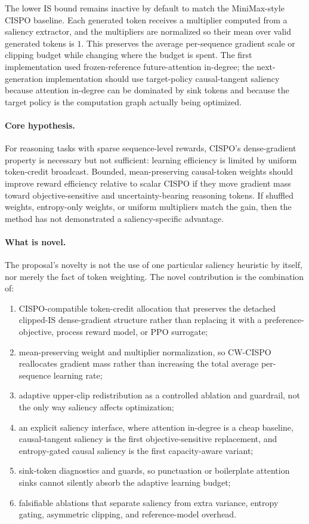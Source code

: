 \documentclass[11pt]{article}
\begin{document}
The lower IS bound remains inactive by default to match the MiniMax-style CISPO
baseline. Each generated token receives a multiplier computed from a saliency
extractor, and the multipliers are normalized so their mean over valid
generated tokens is $1$. This preserves the average per-sequence gradient scale
or clipping budget while changing where the budget is spent. The first
implementation used frozen-reference future-attention in-degree; the
next-generation implementation should use target-policy causal-tangent saliency
because attention in-degree can be dominated by sink tokens and because the
target policy is the computation graph actually being optimized.

\paragraph{Core hypothesis.}
For reasoning tasks with sparse sequence-level rewards, CISPO's dense-gradient
property is necessary but not sufficient: learning efficiency is limited by
uniform token-credit broadcast. Bounded, mean-preserving causal-token weights
should improve reward efficiency relative to scalar CISPO if they move gradient
mass toward objective-sensitive and uncertainty-bearing reasoning tokens. If
shuffled weights, entropy-only weights, or uniform multipliers match the gain,
then the method has not demonstrated a saliency-specific advantage.

\paragraph{What is novel.}
The proposal's novelty is not the use of one particular saliency heuristic by
itself, nor merely the fact of token weighting. The novel contribution is the
combination of:
\begin{enumerate}[leftmargin=*]
  \item CISPO-compatible token-credit allocation that preserves the detached
  clipped-IS dense-gradient structure rather than replacing it with a
  preference-objective, process reward model, or PPO surrogate;
  \item mean-preserving weight and multiplier normalization, so CW-CISPO
  reallocates gradient mass rather than increasing the total average
  per-sequence learning rate;
  \item adaptive upper-clip redistribution as a controlled ablation and
  guardrail, not the only way saliency affects optimization;
  \item an explicit saliency interface, where attention in-degree is a cheap
  baseline, causal-tangent saliency is the first objective-sensitive
  replacement, and entropy-gated causal saliency is the first capacity-aware
  variant;
  \item sink-token diagnostics and guards, so punctuation or boilerplate
  attention sinks cannot silently absorb the adaptive learning budget;
  \item falsifiable ablations that separate saliency from extra variance,
  entropy gating, asymmetric clipping, and reference-model overhead.
\end{enumerate}
\end{document}
